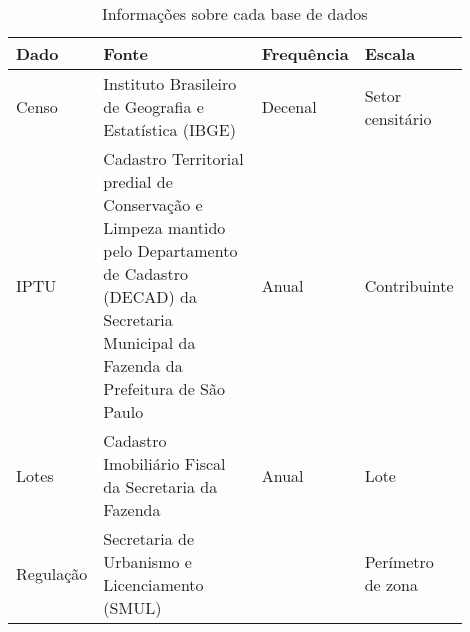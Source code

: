 \begin{table}[h!]
    \centering
    \caption{Informações sobre cada base de dados}

    {\small
    \begin{tabular}{>{\raggedright\arraybackslash}p{0.125\linewidth} >{\raggedright\arraybackslash}p{0.50\linewidth} >{\centering\arraybackslash}p{0.125\linewidth} >{\raggedright\arraybackslash}p{0.15\linewidth}}
        \textbf{Dado} & \textbf{Fonte} & \textbf{Frequência} & \textbf{Escala} \\
        \midrule
        Censo & Instituto Brasileiro de Geografia e Estatística (IBGE) & Decenal & Setor censitário \\
        IPTU & Cadastro Territorial predial de Conservação e Limpeza mantido pelo Departamento de Cadastro (DECAD) da Secretaria Municipal da Fazenda da Prefeitura de São Paulo & Anual & Contribuinte \\
        Lotes & Cadastro Imobiliário Fiscal da Secretaria da Fazenda & Anual & Lote \\
        Regulação & Secretaria de Urbanismo e Licenciamento (SMUL) & 2014 & Perímetro de zona \\
        \bottomrule
    \end{tabular}
    }
    \label{tab:dados}
\end{table}